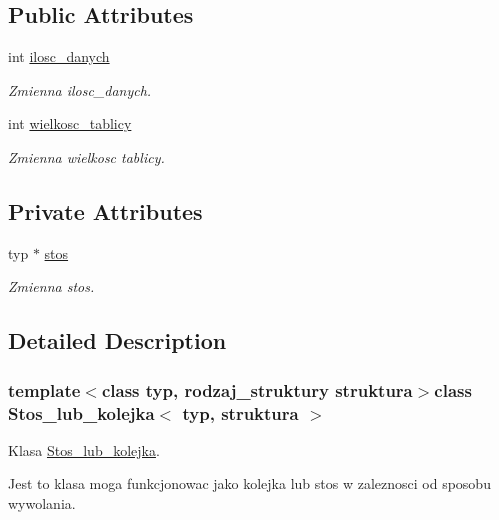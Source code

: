 \subsection*{Public Attributes}
\begin{DoxyCompactItemize}
\item 
int \hyperlink{class_stos__lub__kolejka_a1a93d8c833d23302598430ddf03a3d06}{ilosc\+\_\+danych}
\begin{DoxyCompactList}\small\item\em Zmienna ilosc\+\_\+danych. \end{DoxyCompactList}\item 
int \hyperlink{class_stos__lub__kolejka_a73d579d36148bb5047d5d6693aa69b57}{wielkosc\+\_\+tablicy}
\begin{DoxyCompactList}\small\item\em Zmienna wielkosc tablicy. \end{DoxyCompactList}\end{DoxyCompactItemize}
\subsection*{Private Attributes}
\begin{DoxyCompactItemize}
\item 
typ $\ast$ \hyperlink{class_stos__lub__kolejka_ad4f12e59b183d738823c43eb99c7bd37}{stos}
\begin{DoxyCompactList}\small\item\em Zmienna stos. \end{DoxyCompactList}\end{DoxyCompactItemize}


\subsection{Detailed Description}
\subsubsection*{template$<$class typ, rodzaj\+\_\+struktury struktura$>$class Stos\+\_\+lub\+\_\+kolejka$<$ typ, struktura $>$}

Klasa \hyperlink{class_stos__lub__kolejka}{Stos\+\_\+lub\+\_\+kolejka}. 

Jest to klasa moga funkcjonowac jako kolejka lub stos w zaleznosci od sposobu wywolania. 

